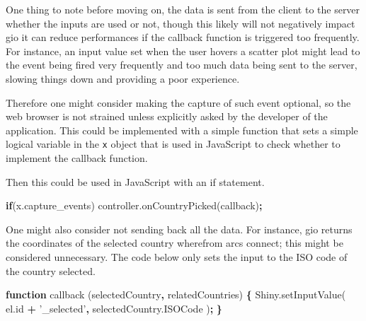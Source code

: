 \documentclass[10pt,]{krantz}
\makeatletter
\newenvironment{Shaded}{\begin{snugshade}}{\end{snugshade}}
\newcommand{\AttributeTok}[1]{\textcolor[rgb]{0.61,0.61,0.61}{#1}}
\newcommand{\CommentTok}[1]{\textcolor[rgb]{0.37,0.37,0.37}{\textit{#1}}}
\newcommand{\ControlFlowTok}[1]{\textcolor[rgb]{0.27,0.27,0.27}{\textbf{#1}}}
\newcommand{\KeywordTok}[1]{\textcolor[rgb]{0.27,0.27,0.27}{\textbf{#1}}}
\newcommand{\NormalTok}[1]{#1}
\newcommand{\OperatorTok}[1]{\textcolor[rgb]{0.43,0.43,0.43}{\textbf{#1}}}
\newcommand{\OtherTok}[1]{\textcolor[rgb]{0.37,0.37,0.37}{#1}}
\newcommand{\StringTok}[1]{\textcolor[rgb]{0.5,0.5,0.5}{#1}}
\newcommand{\VariableTok}[1]{\textcolor[rgb]{0,0,0}{#1}}
\newenvironment{kframe}{%
\medskip{}
\setlength{\fboxsep}{.8em}
 \def\at@end@of@kframe{}%
 \ifinner\ifhmode%
  \def\at@end@of@kframe{\end{minipage}}%
  \begin{minipage}{\columnwidth}%
 \fi\fi%
 \def\FrameCommand##1{\hskip\@totalleftmargin \hskip-\fboxsep
 \colorbox{shadecolor}{##1}\hskip-\fboxsep
     \hskip-\linewidth \hskip-\@totalleftmargin \hskip\columnwidth}%
 \MakeFramed {\advance\hsize-\width
   \@totalleftmargin\z@ \linewidth\hsize
   \@setminipage}}%
 {\par\unskip\endMakeFramed%
 \at@end@of@kframe}
\renewenvironment{Shaded}{\begin{kframe}}{\end{kframe}}
\makeatother
\begin{document}
One thing to note before moving on, the data is sent from the client to the server whether the inputs are used or not, though this likely will not negatively impact gio it can reduce performances if the callback function is triggered too frequently. For instance, an input value set when the user hovers a scatter plot might lead to the event being fired very frequently and too much data being sent to the server, slowing things down and providing a poor experience.

Therefore one might consider making the capture of such event optional, so the web browser is not strained unless explicitly asked by the developer of the application. This could be implemented with a simple function that sets a simple logical variable in the \texttt{x} object that is used in JavaScript to check whether to implement the callback function.

\begin{Shaded}
\end{Shaded}

Then this could be used in JavaScript with an if statement.

\begin{Shaded}
\begin{Highlighting}[]
\ControlFlowTok{if}\NormalTok{(}\VariableTok{x}\NormalTok{.}\AttributeTok{capture_events}\NormalTok{)}
  \VariableTok{controller}\NormalTok{.}\AttributeTok{onCountryPicked}\NormalTok{(callback)}\OperatorTok{;}
\end{Highlighting}
\end{Shaded}

One might also consider not sending back all the data. For instance, gio returns the coordinates of the selected country wherefrom arcs connect; this might be considered unnecessary. The code below only sets the input to the ISO code of the country selected.

\begin{Shaded}
\begin{Highlighting}[]
\KeywordTok{function} \AttributeTok{callback}\NormalTok{ (selectedCountry}\OperatorTok{,}\NormalTok{ relatedCountries) }\OperatorTok{\{}
  \VariableTok{Shiny}\NormalTok{.}\AttributeTok{setInputValue}\NormalTok{(}
    \VariableTok{el}\NormalTok{.}\AttributeTok{id} \OperatorTok{+} \StringTok{'_selected'}\OperatorTok{,} 
    \VariableTok{selectedCountry}\NormalTok{.}\AttributeTok{ISOCode}
\NormalTok{  )}\OperatorTok{;}
\OperatorTok{\}}
\end{Highlighting}
\end{Shaded}
\end{document}
